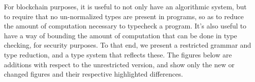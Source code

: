 \documentclass[a4paper]{article}
\begin{document}
For blockchain purposes, it is useful to not only have an algorithmic system, but to require that no un-normalized types are present in programs, so as to reduce the amount of computation necessary to typecheck a program. It's also useful to have a way of bounding the amount of computation that can be done in type checking, for security purposes. To that end, we present a restricted grammar and type reduction, and a type system that reflects these. The figures below are additions with respect to the unrestricted version, and show only the new or changed figures and their respective highlighted differences.








\end{document}
